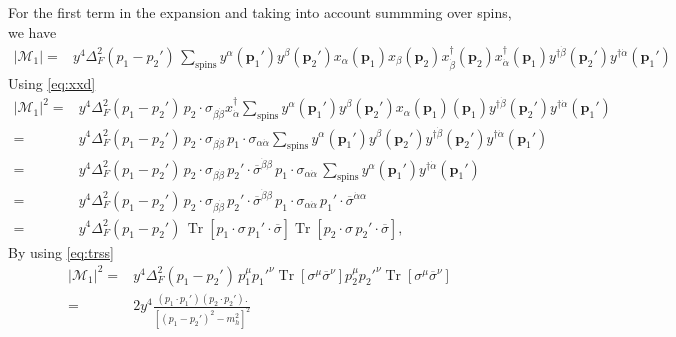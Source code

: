 For the first term in the expansion and taking into account summming over spins, we have
\begin{align}
 \left| \mathcal{M}_1 \right| = &y^4 \Delta_F^2(p_1-p_2')\, \sum_{\text{spins}}y^{\alpha}(\mathbf{p}_1')y^{\beta}(\mathbf{p}_2')x_{\alpha}(\mathbf{p}_1)x_{\beta}(\mathbf{p}_2) 
x_{\dot{\beta}}^{\dagger}(\mathbf{p}_2)x_{\dot{\alpha}}^{\dagger}(\mathbf{p}_1)y^{\dagger\dot{\beta}} (\mathbf{p}_2') y^{\dagger\dot{\alpha}}(\mathbf{p}_1') 
\end{align}
Using \eqref{eq:xxd}
\begin{align}
  \left| \mathcal{M}_1 \right|^2 = &y^4 \Delta_F^2(p_1-p_2')\,p_2\cdot \sigma_{\beta\dot{\beta}} x_{\dot{\alpha}}^{\dagger}  \sum_{\text{spins}}y^{\alpha}(\mathbf{p}_1')y^{\beta}(\mathbf{p}_2') x_{\alpha}(\mathbf{p}_1)(\mathbf{p}_1)y^{\dagger\dot{\beta}} (\mathbf{p}_2') y^{\dagger\dot{\alpha}}(\mathbf{p}_1') \nonumber\\
= &y^4 \Delta_F^2(p_1-p_2')\, p_2\cdot \sigma_{\beta\dot{\beta}}\, p_1\cdot \sigma_{\alpha\dot{\alpha}}   \sum_{\text{spins}}y^{\alpha}(\mathbf{p}_1')y^{\beta}(\mathbf{p}_2') y^{\dagger\dot{\beta}} (\mathbf{p}_2') y^{\dagger\dot{\alpha}}(\mathbf{p}_1') \nonumber\\
 = &y^4 \Delta_F^2(p_1-p_2')\, p_2\cdot \sigma_{\beta\dot{\beta}}\,p_2'\cdot \overline{\sigma}^{\dot{\beta}\beta}\, p_1\cdot \sigma_{\alpha\dot{\alpha}}\,   \sum_{\text{spins}}y^{\alpha}(\mathbf{p}_1') y^{\dagger\dot{\alpha}}(\mathbf{p}_1') \nonumber\\
= &y^4 \Delta_F^2(p_1-p_2')\, p_2\cdot \sigma_{\beta\dot{\beta}}\,p_2'\cdot \overline{\sigma}^{\dot{\beta}\beta}\, p_1\cdot \sigma_{\alpha\dot{\alpha}}   \,p_1'\cdot \overline{\sigma}^{\dot{\alpha}\alpha}    \nonumber\\
= &y^4 \Delta_F^2(p_1-p_2')\,\operatorname{Tr} \left[ p_1\cdot \sigma   \,p_1'\cdot \overline{\sigma} \right]  \operatorname{Tr}\left[p_2\cdot\sigma\,p_2'\cdot \overline{\sigma}  \right],
\end{align}
By using \eqref{eq:trss}
\begin{align}
  \left| \mathcal{M}_1 \right|^2 = & y^4  \Delta_F^2(p_1-p_2')\,p_1^{\mu}{p_1'}^{\nu}\operatorname{Tr} \left[  \sigma^{\mu}  \overline{\sigma}^{\nu} \right] p_2^{\mu}{p_2'}^{\nu} \operatorname{Tr}\left[\sigma^{\mu} \overline{\sigma}^{\nu} \right]\nonumber\\
= & 2y^4  \frac{\left( p_1\cdot p_1' \right) \left( p_2\cdot{p_2'} \right).}{\left[ \left(p_1-p_2'\right)^2-m^2_h \right]^2}\,
\end{align}
